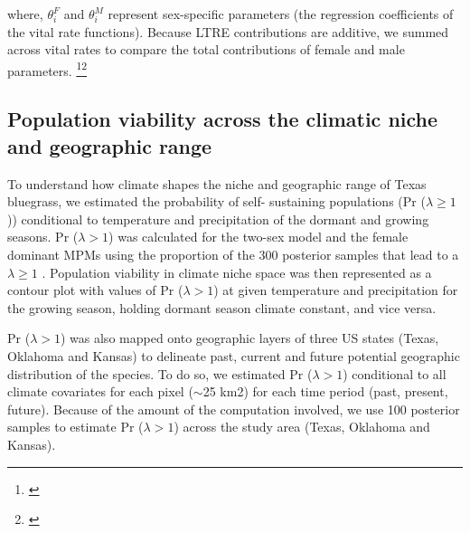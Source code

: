 \documentclass[12pt]{article}\usepackage[]{graphicx}\usepackage[dvipsnames]{xcolor}
\newcommand{\tom}[2]{{\color{red}{#1}}\footnote{\textit{\color{red}{#2}}}}
\newcommand{\jacob}[2]{{\color{blue}{#1}}\footnote{\textit{\color{blue}{#2}}}}
\begin{document}
\noindent where, $\theta^{F}_{i}$ and $\theta^{M}_{i}$ represent sex-specific parameters (the regression coefficients of the vital rate functions). 
Because LTRE contributions are additive, we summed across vital rates to compare the total contributions of female and male parameters.
\jacob{}{Let's talk about this}\tom{}{I do not agree. It is true that you can compute this, but only by ``turning off'' the interaction by holding the interacting variable constant. I still think this needs to be better addressed in both LTRE analyses.}

\subsection*{Population viability across the climatic niche and geographic range}
To understand how climate shapes the niche and geographic range of Texas bluegrass, we estimated the probability of self- sustaining populations (Pr ($\lambda \ge 1$)) conditional to temperature and precipitation of the dormant and growing seasons.
Pr ($\lambda > 1$) was calculated for the two-sex model and the female dominant MPMs using the proportion of the 300 posterior samples that lead to a $\lambda \ge 1$ \citep{diez2014probabilistic}.
Population viability in climate niche space was then represented as a contour plot with values of Pr ($\lambda > 1$) at given temperature and precipitation for the growing season, holding dormant season climate constant, and vice versa. 

Pr ($\lambda > 1$) was also mapped onto geographic layers of three US states (Texas, Oklahoma and Kansas) to delineate past, current and future potential geographic distribution of the species.
To do so, we estimated Pr ($\lambda > 1$) conditional to all climate covariates for each pixel ($\sim$25 km2) for each time period (past, present, future).
Because of the amount of the computation involved, we use 100 posterior samples to estimate Pr ($\lambda > 1$) across the study area (Texas, Oklahoma and Kansas).

\end{document}
